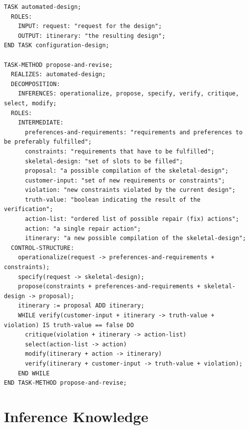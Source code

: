 \documentclass[11pt]{article} %
\begin{document}
\begin{lstlisting}[label=Task,caption=Task and task method description,breaklines=true]
TASK automated-design;
  ROLES:
    INPUT: request: "request for the design";
    OUTPUT: itinerary: "the resulting design";
END TASK configuration-design;

TASK-METHOD propose-and-revise;
  REALIZES: automated-design;
  DECOMPOSITION:
    INFERENCES: operationalize, propose, specify, verify, critique, select, modify;
  ROLES:
    INTERMEDIATE:
      preferences-and-requirements: "requirements and preferences to be preferably fulfilled";
      constraints: "requirements that have to be fulfilled";
      skeletal-design: "set of slots to be filled";
      proposal: "a possible compilation of the skeletal-design";
      customer-input: "set of new requirements or constraints";
      violation: "new constraints violated by the current design";
      truth-value: "boolean indicating the result of the verification";
      action-list: "ordered list of possible repair (fix) actions";
      action: "a single repair action";
      itinerary: "a new possible compilation of the skeletal-design";
  CONTROL-STRUCTURE:
    operationalize(request -> preferences-and-requirements + constraints);
    specify(request -> skeletal-design);
    propose(constraints + preferences-and-requirements + skeletal-design -> proposal);
    itinerary := proposal ADD itinerary;
    WHILE verify(customer-input + itinerary -> truth-value + violation) IS truth-value == false DO
      critique(violation + itinerary -> action-list)
      select(action-list -> action)
      modify(itinerary + action -> itinerary)
      verify(itinerary + customer-input -> truth-value + violation);
    END WHILE
END TASK-METHOD propose-and-revise;
\end{lstlisting}

\clearpage
\section{Inference Knowledge} \label{sec:inference}
\end{document}
